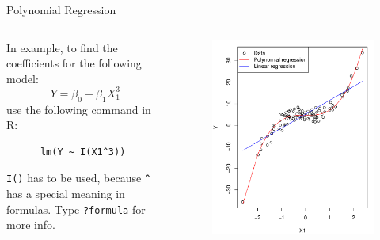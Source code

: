 \begin{frame}[fragile]{Polynomial Regression}
    \begin{columns}
        \begin{column}{0.5\linewidth}
            In example, to find the coefficients for the following model:
            \begin{equation*}
                Y = \beta_0 + \beta_1 X_1^3
            \end{equation*}
            use the following command in R:
            \begin{verbatim}
      lm(Y ~ I(X1^3))
            \end{verbatim}
            {\small\texttt{I()}} has to be used, because {\small\texttt{\^}}
            has a special meaning in formulas. Type {\small\texttt{?formula}}
            for more info.
        \end{column}
        \begin{column}{0.5\linewidth}
            \begin{figure}
                \includegraphics[width=\linewidth]{R/plots/poly_regression}
            \end{figure}
        \end{column}
    \end{columns}
\end{frame}

